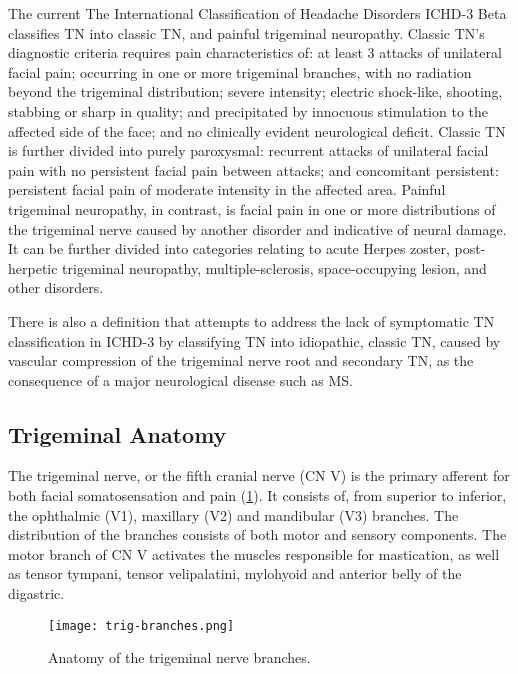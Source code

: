 The current The International Classification of Headache Disorders ICHD-3 Beta \cite{Society2013} classifies TN into classic TN, and painful trigeminal neuropathy. 
Classic TN's diagnostic criteria requires pain characteristics of: at least 3 attacks of unilateral facial pain; occurring in one or more trigeminal branches, with no radiation beyond the trigeminal distribution; severe intensity; electric shock-like, shooting, stabbing or sharp in quality; and precipitated by innocuous stimulation to the affected side of the face; and no clinically evident neurological deficit. Classic TN is further divided into purely paroxysmal: recurrent attacks of unilateral facial pain with no persistent facial pain between attacks; and concomitant persistent: persistent facial pain of moderate intensity in the affected area. 
Painful trigeminal neuropathy, in contrast, is facial pain in one or more distributions of the trigeminal nerve caused by another disorder and indicative of neural damage. It can be further divided into categories relating to acute Herpes zoster, post-herpetic trigeminal neuropathy, multiple-sclerosis, space-occupying lesion, and other disorders.

There is also a definition \cite{Zakrzewska2016} that attempts to address the lack of symptomatic TN classification in ICHD-3 by classifying TN into idiopathic, classic TN, caused by vascular compression of the trigeminal nerve root and secondary TN, as the consequence of a major neurological disease such as MS. 

\subsection{Trigeminal Anatomy}

The trigeminal nerve, or the fifth cranial nerve (CN V) is the primary afferent for both facial somatosensation and pain (\ref{fig:trig-branches}). It consists of, from superior to inferior, the ophthalmic (V1), maxillary (V2) and mandibular (V3) branches. The distribution of the branches consists of both motor and sensory components. The motor branch of CN V activates the muscles responsible for mastication, as well as tensor tympani, tensor velipalatini, mylohyoid and anterior belly of the digastric. 

 \begin{figure}[ht]
 \texttt{[image: trig-branches.png]}
 \centering
 \caption{Anatomy of the trigeminal nerve branches. \protect\cite{gray1918anatomy}} 
 \label{fig:trig-branches} 
 \end{figure}
 
